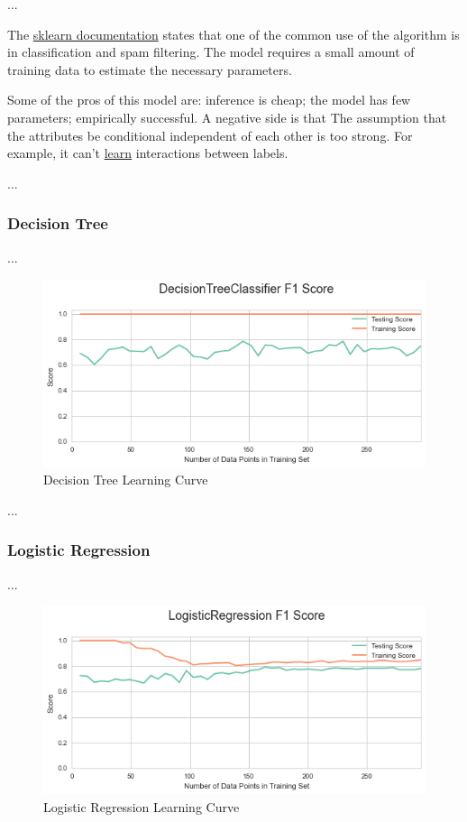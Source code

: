\documentclass[a4paper]{article}
\begin{document}
...

The \href{http://scikit-learn.org/stable/modules/naive_bayes.html}{sklearn documentation} states that  one of the common use of the algorithm is in classification and spam filtering. The model requires a small amount of training data to estimate the necessary parameters.

Some of the pros of this model are: inference is cheap; the model has few parameters; empirically successful. A negative side is that The assumption that the attributes be conditional independent of each other is too strong. For example, it can't \href{http://blog.echen.me/2011/04/27/choosing-a-machine-learning-classifier/}{learn} interactions between labels.

...

\subsubsection{Decision Tree}
...

\begin{figure}[ht]
\centering
\includegraphics[width=1\textwidth]{figures/DT.png}
\caption{\label{fig:DT}Decision Tree Learning Curve}
\end{figure}

...

\subsubsection{Logistic Regression}
...

\begin{figure}[ht]
\centering
\includegraphics[width=1\textwidth]{figures/LogisticReg.png}
\caption{\label{fig:LogisticReg}Logistic Regression Learning Curve}
\end{figure}
\end{document}
